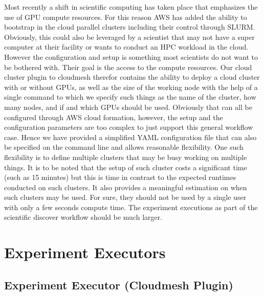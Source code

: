 \documentclass[utf8]{FrontiersinVancouver} %
\begin{document}
Most recently a shift in scientific computing has taken place that emphasizes the use of GPU compute resources. For this reason AWS has added the ability to bootstrap in the cloud parallel clusters including their control through SLURM. Obviously, this could also be leveraged by a scientist that may not have a super computer at their facility or wants to conduct an HPC workload in the cloud. However the configuration and setup is something most scientists do not want to be bothered with. Their goal is the access to the compute resources. Our cloud cluster plugin to cloudmesh therefor contains the ability to deploy a cloud cluster with or without GPUs, as well as the size of the working node with the help of a single command to which we specify such things as the name of the cluster, how many nodes, and if and which GPUs should be used. Obviously that can all be configured through AWS cloud formation, however, the setup and the configuration parameters are too complex to just support this general workflow case. Hence we have provided a simplified YAML configuration file that can also be specified on the command line  and allows reasonable flexibility. One such flexibility is to define multiple clusters that may be busy working on multiple things. It is to be noted that the setup of such cluster costs a significant time (such as 15 minutes) but this is time in contrast to the expected runtimes conducted on such clusters. It also provides a meaningful estimation on when such clusters may be used. For sure, they should not be used by a single user with only a few seconds compute time.  The experiment executions as part of the scientific discover workflow should be much larger.





\section{Experiment Executors}

\citep{las-frontiers-edu}

\subsection{Experiment Executor (Cloudmesh Plugin)}
\end{document}
